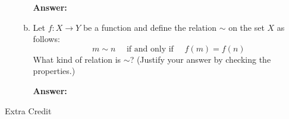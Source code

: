 \documentclass[12pt]{article}
\newcommand{\<}{\ensuremath{\langle}}
\renewcommand{\>}{\ensuremath{\rangle}}
\begin{document}
\begin{enumerate}[{\bf 1.}]
\begin{enumerate}[(a)]
    \medskip

    {\bf Answer:} 
        \vskip5cm
      \item Let $f:X \rightarrow Y$ be a function and define the relation $\sim$
        on the set $X$ as follows:
        \[
        m \sim n \quad \text{ if and only if } \quad f(m) = f(n)
        \]
        What kind of relation is $\sim$?  (Justify your answer by checking the properties.)

    \medskip

    {\bf Answer:} 


      \end{enumerate}

      \newpage
\end{enumerate}
\begin{center}
  Extra Credit
\end{center}
\end{document}
